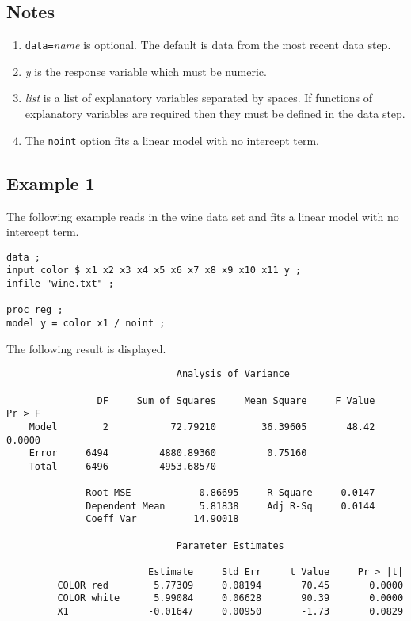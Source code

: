 \documentclass[12pt]{article}
\begin{document}
\subsection*{Notes}

\begin{enumerate}
\item
{\tt data=}{\it name} is optional.
The default is data from the most recent data step.
\item
{\it y} is the response variable which must be numeric.
\item
{\it list} is a list of explanatory variables separated by spaces.
If functions of explanatory variables are required then
they must be defined in the data step.
\item
The {\tt noint} option fits a linear model with no intercept term.
\end{enumerate}

\subsection*{Example 1}

The following example reads in the wine data set and fits
a linear model with no intercept term.

{\scriptsize\begin{verbatim}
data ;
input color $ x1 x2 x3 x4 x5 x6 x7 x8 x9 x10 x11 y ;
infile "wine.txt" ;

proc reg ;
model y = color x1 / noint ;
\end{verbatim}}

The following result is displayed.

{\scriptsize\begin{verbatim}
                              Analysis of Variance

                DF     Sum of Squares     Mean Square     F Value     Pr > F
    Model        2           72.79210        36.39605       48.42     0.0000
    Error     6494         4880.89360         0.75160                       
    Total     6496         4953.68570                                       

              Root MSE            0.86695     R-Square     0.0147
              Dependent Mean      5.81838     Adj R-Sq     0.0144
              Coeff Var          14.90018                        

                              Parameter Estimates

                         Estimate     Std Err     t Value     Pr > |t|
         COLOR red        5.77309     0.08194       70.45       0.0000
         COLOR white      5.99084     0.06628       90.39       0.0000
         X1              -0.01647     0.00950       -1.73       0.0829
\end{verbatim}}
\end{document}
